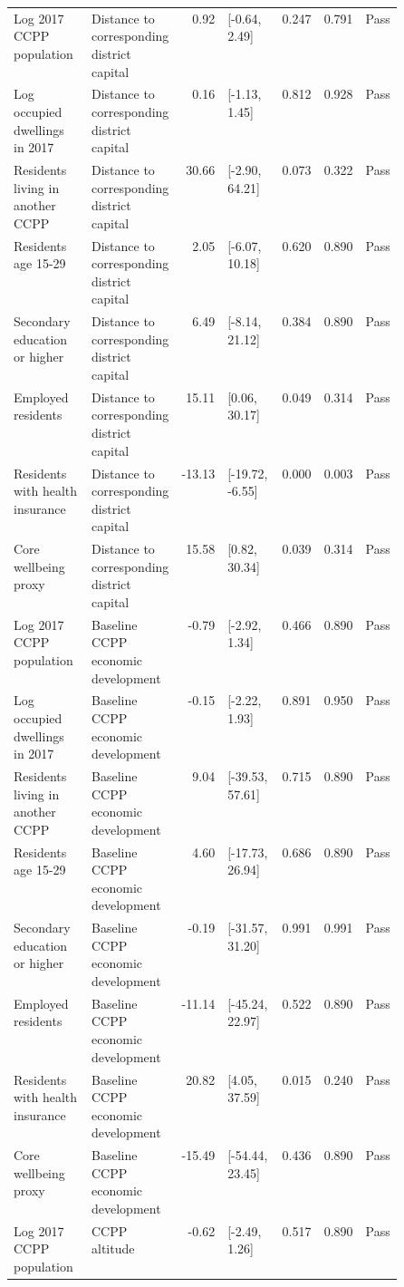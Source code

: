 \begin{longtable}{@{}p{0.20\linewidth}p{0.16\linewidth}rp{0.14\linewidth}rrl@{}}
Log 2017 CCPP population & Distance to corresponding district capital & 0.92 & [-0.64, 2.49] & 0.247 & 0.791 & Pass \\
Log occupied dwellings in 2017 & Distance to corresponding district capital & 0.16 & [-1.13, 1.45] & 0.812 & 0.928 & Pass \\
Residents living in another CCPP & Distance to corresponding district capital & 30.66 & [-2.90, 64.21] & 0.073 & 0.322 & Pass \\
Residents age 15-29 & Distance to corresponding district capital & 2.05 & [-6.07, 10.18] & 0.620 & 0.890 & Pass \\
Secondary education or higher & Distance to corresponding district capital & 6.49 & [-8.14, 21.12] & 0.384 & 0.890 & Pass \\
Employed residents & Distance to corresponding district capital & 15.11 & [0.06, 30.17] & 0.049 & 0.314 & Pass \\
Residents with health insurance & Distance to corresponding district capital & -13.13 & [-19.72, -6.55] & 0.000 & 0.003 & Pass \\
Core wellbeing proxy & Distance to corresponding district capital & 15.58 & [0.82, 30.34] & 0.039 & 0.314 & Pass \\
Log 2017 CCPP population & Baseline CCPP economic development & -0.79 & [-2.92, 1.34] & 0.466 & 0.890 & Pass \\
Log occupied dwellings in 2017 & Baseline CCPP economic development & -0.15 & [-2.22, 1.93] & 0.891 & 0.950 & Pass \\
Residents living in another CCPP & Baseline CCPP economic development & 9.04 & [-39.53, 57.61] & 0.715 & 0.890 & Pass \\
Residents age 15-29 & Baseline CCPP economic development & 4.60 & [-17.73, 26.94] & 0.686 & 0.890 & Pass \\
Secondary education or higher & Baseline CCPP economic development & -0.19 & [-31.57, 31.20] & 0.991 & 0.991 & Pass \\
Employed residents & Baseline CCPP economic development & -11.14 & [-45.24, 22.97] & 0.522 & 0.890 & Pass \\
Residents with health insurance & Baseline CCPP economic development & 20.82 & [4.05, 37.59] & 0.015 & 0.240 & Pass \\
Core wellbeing proxy & Baseline CCPP economic development & -15.49 & [-54.44, 23.45] & 0.436 & 0.890 & Pass \\
Log 2017 CCPP population & CCPP altitude & -0.62 & [-2.49, 1.26] & 0.517 & 0.890 & Pass \\

\end{longtable}
